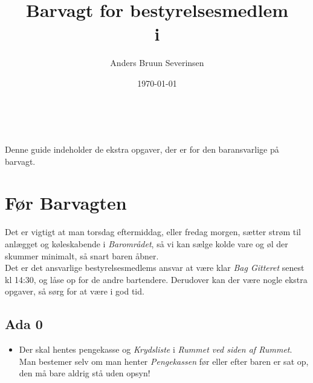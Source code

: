 

\title{Barvagt for bestyrelsesmedlem\\ i \fredagscafeen}
\date{\today}
\author{Anders Bruun Severinsen}



\maketitle

\tableofcontents \

Denne guide indeholder de ekstra opgaver, 
der er for den baransvarlige på barvagt.

\section{Før Barvagten}
\label{sec:pre-barvagten}
Det er vigtigt at man torsdag eftermiddag, eller fredag morgen, sætter strøm til anlægget og køleskabende i 
\textit{Barområdet}, så vi kan sælge kolde vare og øl der skummer minimalt, så snart baren åbner.\\

Det er det ansvarlige bestyrelsesmedlems ansvar at være klar \textit{Bag Gitteret} senest kl 14:30, 
og låse op for de andre bartendere.
Derudover kan der være nogle ekstra opgaver, så sørg for at være i god tid. 

\subsection{Ada 0}
\label{sec:pre:ada}

\begin{itemize}
    \item Der skal hentes pengekasse og \textit{Krydsliste} i \textit{Rummet ved siden af 
    Rummet}. Man bestemer selv om man henter 
    \textit{Pengekassen} før eller efter baren er sat op, den må bare aldrig stå uden opsyn!
\end{itemize}

